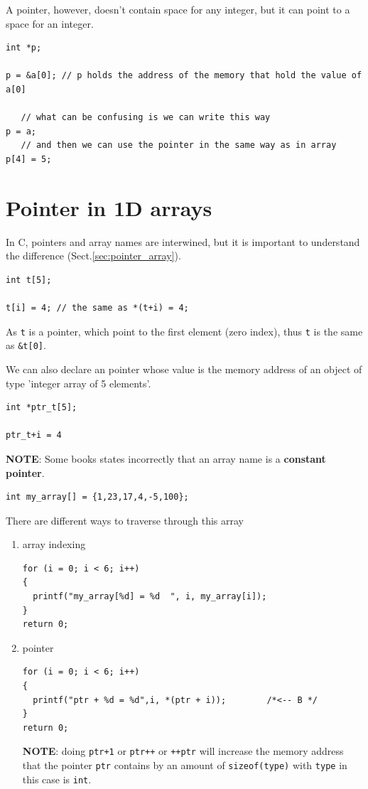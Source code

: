 A pointer, however, doesn't contain space for any integer, but it can point to a
space for an integer. 
\begin{verbatim}
int *p;
 
p = &a[0]; // p holds the address of the memory that hold the value of a[0]

   // what can be confusing is we can write this way
p = a; 
   // and then we can use the pointer in the same way as in array
p[4] = 5;
\end{verbatim}


\section{Pointer in 1D arrays}
\label{sec:pointer-1Darrays}

In C, pointers and array names are interwined, but it is important to understand
the difference (Sect.\ref{sec:pointer_array}).
\begin{lstlisting}
int t[5];

t[i] = 4; // the same as *(t+i) = 4;
\end{lstlisting}
As \verb!t! is a pointer, which point to the first element (zero
index), thus \verb!t! is the same as \verb!&t[0]!.

We can also declare an pointer whose value is the memory address of an object of
type 'integer array of 5 elements'.
\begin{lstlisting}
int *ptr_t[5];

ptr_t+i = 4
\end{lstlisting}

{\bf NOTE}: Some books states incorrectly that an array name is a
{\bf constant pointer}.

\begin{lstlisting}
int my_array[] = {1,23,17,4,-5,100}; 
\end{lstlisting}
There are different ways to traverse through this array

\begin{enumerate}
\item array indexing
\begin{lstlisting}
for (i = 0; i < 6; i++)
{
  printf("my_array[%d] = %d  ", i, my_array[i]);   
}
return 0;
\end{lstlisting}
\item pointer
\begin{lstlisting}
for (i = 0; i < 6; i++)
{
  printf("ptr + %d = %d",i, *(ptr + i));        /*<-- B */
}
return 0;
\end{lstlisting}

{\bf NOTE}: doing \verb!ptr+1! or \verb!ptr++! or \verb!++ptr! will
increase the memory address that the pointer \verb!ptr! contains by an
amount of \verb!sizeof(type)! with \verb!type! in this case is
\verb!int!. 
\end{enumerate}

